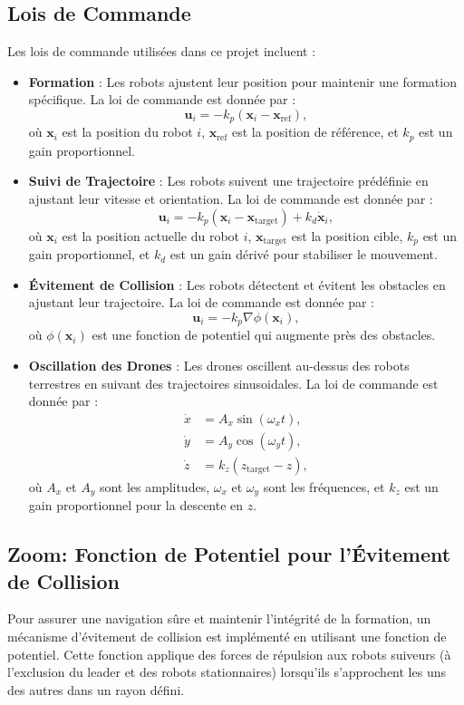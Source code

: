 \documentclass[a4paper,12pt]{article}
\begin{document}
\subsection*{Lois de Commande}
Les lois de commande utilisées dans ce projet incluent :
\begin{itemize}
    \item \textbf{Formation} : Les robots ajustent leur position pour maintenir une formation spécifique. La loi de commande est donnée par :
    \[
    \mathbf{u}_i = -k_p (\mathbf{x}_i - \mathbf{x}_\text{ref}),
    \]
    \noindent où $\mathbf{x}_i$ est la position du robot $i$, $\mathbf{x}_\text{ref}$ est la position de référence, et $k_p$ est un gain proportionnel.
    \item \textbf{Suivi de Trajectoire} : Les robots suivent une trajectoire prédéfinie en ajustant leur vitesse et orientation. La loi de commande est donnée par :
    \[
    \mathbf{u}_i = -k_p (\mathbf{x}_i - \mathbf{x}_\text{target}) + k_d \dot{\mathbf{x}}_i,
    \]
    \noindent où $\mathbf{x}_i$ est la position actuelle du robot $i$, $\mathbf{x}_\text{target}$ est la position cible, $k_p$ est un gain proportionnel, et $k_d$ est un gain dérivé pour stabiliser le mouvement.
    \item \textbf{Évitement de Collision} : Les robots détectent et évitent les obstacles en ajustant leur trajectoire. La loi de commande est donnée par :
    \[
    \mathbf{u}_i = -k_p \nabla \phi(\mathbf{x}_i),
    \]
    \noindent où $\phi(\mathbf{x}_i)$ est une fonction de potentiel qui augmente près des obstacles.
    \item \textbf{Oscillation des Drones} : Les drones oscillent au-dessus des robots terrestres en suivant des trajectoires sinusoidales. La loi de commande est donnée par :
    \[
    \begin{aligned}
    \dot{x} &= A_x \sin(\omega_x t), \\
    \dot{y} &= A_y \cos(\omega_y t), \\
    \dot{z} &= k_z (z_\text{target} - z),
    \end{aligned}
    \]
    \noindent où $A_x$ et $A_y$ sont les amplitudes, $\omega_x$ et $\omega_y$ sont les fréquences, et $k_z$ est un gain proportionnel pour la descente en $z$.
\end{itemize}

\subsection*{Zoom: Fonction de Potentiel pour l'Évitement de Collision}
Pour assurer une navigation sûre et maintenir l'intégrité de la formation, un mécanisme d'évitement de collision est implémenté en utilisant une fonction de potentiel. Cette fonction applique des forces de répulsion aux robots suiveurs (à l'exclusion du leader et des robots stationnaires) lorsqu'ils s'approchent les uns des autres dans un rayon défini.
\end{document}
